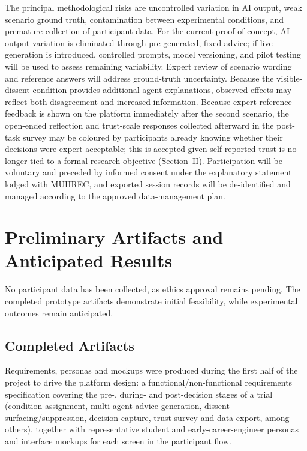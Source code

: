 \documentclass[conference]{IEEEtran}
\begin{document}
The principal methodological risks are uncontrolled variation in AI output, weak scenario ground truth, contamination between experimental conditions, and premature collection of participant data. For the current proof-of-concept, AI-output variation is eliminated through pre-generated, fixed advice; if live generation is introduced, controlled prompts, model versioning, and pilot testing will be used to assess remaining variability. Expert review of scenario wording and reference answers will address ground-truth uncertainty. Because the visible-dissent condition provides additional agent explanations, observed effects may reflect both disagreement and increased information. Because expert-reference feedback is shown on the platform immediately after the second scenario, the open-ended reflection and trust-scale responses collected afterward in the post-task survey may be coloured by participants already knowing whether their decisions were expert-acceptable; this is accepted given self-reported trust is no longer tied to a formal research objective (Section~II). Participation will be voluntary and preceded by informed consent under the explanatory statement lodged with MUHREC, and exported session records will be de-identified and managed according to the approved data-management plan.





\section{Preliminary Artifacts and Anticipated Results}

No participant data has been collected, as ethics approval remains pending. The completed prototype artifacts demonstrate initial feasibility, while experimental outcomes remain anticipated.

\subsection{Completed Artifacts}

Requirements, personas and mockups were produced during the first half of the project to drive the platform design: a functional/non-functional requirements specification covering the pre-, during- and post-decision stages of a trial (condition assignment, multi-agent advice generation, dissent surfacing/suppression, decision capture, trust survey and data export, among others), together with representative student and early-career-engineer personas and interface mockups for each screen in the participant flow.
\end{document}
